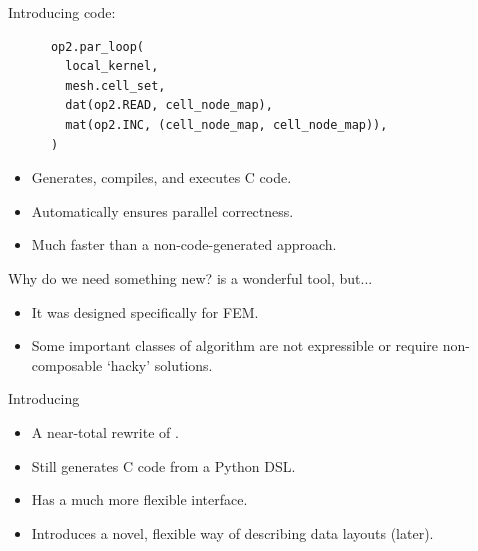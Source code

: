 \documentclass[aspectratio=169]{beamer}
\begin{document}
\begin{frame}[fragile]{Introducing }
   code:
  \begin{center}
    \begin{verbatim}
      op2.par_loop(
        local_kernel,
        mesh.cell_set,
        dat(op2.READ, cell_node_map),
        mat(op2.INC, (cell_node_map, cell_node_map)),
      )
    \end{verbatim}
  \end{center}

  \vspace{1em}

  \begin{itemize}
    \item Generates, compiles, and executes C code.
    \item Automatically ensures parallel correctness.
    \item Much faster than a non-code-generated approach.
  \end{itemize}
\end{frame}

\begin{frame}{Why do we need something new?}
   is a wonderful tool, but...

  \begin{itemize}
    \item
      It was designed specifically for FEM.
    \item
      Some important classes of algorithm are not expressible or require non-composable `hacky' solutions.
  \end{itemize}
\end{frame}

\begin{frame}{Introducing }
  \begin{itemize}
    \item A near-total rewrite of .
    \item Still generates C code from a Python DSL.
    \item Has a much more flexible interface.
    \item Introduces a novel, flexible way of describing data layouts (later).
  \end{itemize}
\end{frame}
\end{document}
